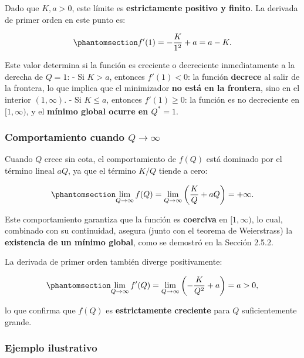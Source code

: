 \documentclass[
  spanish,
  us-letterpaper,
  DIV=11,
  numbers=noendperiod]{scrreprt}
\numberwithin{equation}{section}
\begin{document}
Dado que \(K, a > 0\), este límite es \textbf{estrictamente positivo y
finito}. La derivada de primer orden en este punto es:

\begin{equation}\phantomsection\label{eq-fp_Q1}{
f'(1) = -\frac{K}{1^2} + a = a - K.
}\end{equation}

Este valor determina si la función es creciente o decreciente
inmediatamente a la derecha de \(Q = 1\): - Si \(K > a\), entonces
\(f'(1) < 0\): la función \textbf{decrece} al salir de la frontera, lo
que implica que el minimizador \textbf{no está en la frontera}, sino en
el interior \((1, \infty)\). - Si \(K \leq a\), entonces
\(f'(1) \geq 0\): la función es no decreciente en \([1, \infty)\), y el
\textbf{mínimo global ocurre en \(Q^* = 1\)}.

\subsubsection{\texorpdfstring{Comportamiento cuando
\(Q \to \infty\)}{Comportamiento cuando Q \textbackslash to \textbackslash infty}}\label{comportamiento-cuando-q-to-infty}

Cuando \(Q\) crece sin cota, el comportamiento de \(f(Q)\) está dominado
por el término lineal \(a Q\), ya que el término \(K/Q\) tiende a cero:

\begin{equation}\phantomsection\label{eq-lim_Qinf}{
\lim_{Q \to \infty} f(Q) = \lim_{Q \to \infty} \left( \frac{K}{Q} + a Q \right) = +\infty.
}\end{equation}

Este comportamiento garantiza que la función es \textbf{coerciva} en
\([1, \infty)\), lo cual, combinado con su continuidad, asegura (junto
con el teorema de Weierstrass) la \textbf{existencia de un mínimo
global}, como se demostró en la Sección 2.5.2.

La derivada de primer orden también diverge positivamente:

\begin{equation}\phantomsection\label{eq-fp_Qinf}{
\lim_{Q \to \infty} f'(Q) = \lim_{Q \to \infty} \left( -\frac{K}{Q^2} + a \right) = a > 0,
}\end{equation}

lo que confirma que \(f(Q)\) es \textbf{estrictamente creciente} para
\(Q\) suficientemente grande.

\subsubsection{Ejemplo ilustrativo}\label{ejemplo-ilustrativo-3}
\end{document}
